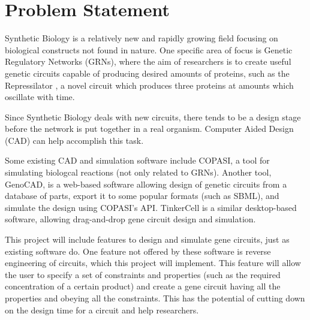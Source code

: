 \documentclass{article}
\begin{document}
	
	
	
	
	
	
	\newpage
	
	\appendix
	\appendixpage
	\addappheadtotoc
	

	\section{Problem Statement}
	
	\par Synthetic Biology is a relatively new and rapidly growing field focusing on biological constructs not found in nature. One specific area of focus is Genetic Regulatory Networks (GRNs), where the aim of researchers is to create useful genetic circuits capable of producing desired amounts of proteins, such as the Repressilator \cite{repressilator}, a novel circuit which produces three proteins at amounts which oscillate with time.
	\par Since Synthetic Biology deals with new circuits, there tends to be a design stage before the network is put together in a real organism. Computer Aided Design (CAD) can help accomplish this task.
	\par Some existing CAD and simulation software include COPASI\cite{copasi}, a tool for simulating biologcal reactions (not only related to GRNs). Another tool, GenoCAD\cite{genocad}, is a web-based software allowing design of genetic circuits from a database of parts, export it to some popular formats (such as SBML), and simulate the design using COPASI's API. TinkerCell\cite{tinkercell} is a similar desktop-based software, allowing drag-and-drop gene circuit design and simulation.
	\par This project will include features to design and simulate gene circuits, just as existing software do. One feature not offered by these software is reverse engineering of circuits, which this project will implement. This feature will allow the user to specify a set of constraints and properties (such as the required concentration of a certain product) and create a gene circuit having all the properties and obeying all the constraints. This has the potential of cutting down on the design time for a circuit and help researchers.
	
\end{document}
